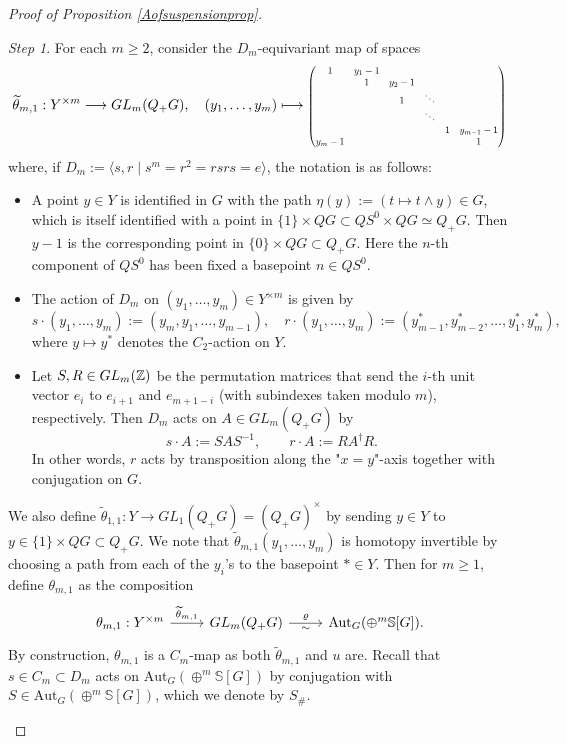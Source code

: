 \documentclass[a4paper, oneside]{amsart}
\newcommand{\1}{\mathds{1}}
\theoremstyle{remark}
\newtheorem{step}{Step}
\theoremstyle{definition}
\newcommand{\Z}{{\scaleobj{0.97}{\mathbb{Z}}}}
\newcommand{\s}{\mathbb{S}}
\numberwithin{equation}{section}
\begin{document}
\begin{proof}[Proof of Proposition \ref{Aofsuspensionprop}]
\begin{step}
For each $m\geq 2$, consider the $D_m$-equivariant map of spaces
    $$
\widetilde{\theta}_{m,1}: Y^{\times m}\longrightarrow GL_m(Q_+G), \quad (y_1,\dots, y_m)\longmapsto \resizebox{5cm}{!}{$\begin{pmatrix}
    1 & y_1-1 & &&&\\
    &1& y_2-1 &&&\\
    &&1&\ddots&&\\
    &&&\ddots&&\\
    &&&&1&y_{m-1}-1\\
    y_m-1 &&&&&1
\end{pmatrix}$}
    $$
    where, if $D_m:=\langle s,r\mid s^m=r^2=rsrs=e\rangle$, the notation is as follows:
\begin{itemize}\setlength\itemsep{3pt}
    \item A point $y\in Y$ is identified in $G$ with the path $\eta(y):=(t\mapsto t\wedge y)\in G$, which is itself identified with a point in $\{1\}\times QG\subset QS^0\times QG\simeq Q_+G$. Then $y-1$ is the corresponding point in $\{0\}\times QG\subset Q_+G$. Here the $n$-th component of $QS^0$ has been fixed a basepoint $n\in QS^0$.


    \item The action of $D_m$ on $(y_1,\dots, y_m)\in Y^{\times m}$ is given by
    $$
s\cdot (y_1,\dots, y_m):=(y_m, y_1,\dots, y_{m-1}), \quad r\cdot(y_1,\dots, y_m):=(y^*_{m-1}, y^*_{m-2},\dots,  y_1^*, y_m^*),
    $$
    where $y\mapsto  y^*$ denotes the $C_2$-action on $Y$.

    \item Let $S, R\in GL_m(\Z)$ be the permutation matrices that send the $i$-th unit vector $e_i$ to $e_{i+1}$ and $e_{m+1-i}$ (with subindexes taken modulo $m$), respectively. Then $D_m$ acts on $A\in GL_m(Q_+ G)$ by
    $$
s\cdot A:=SAS^{-1}, \qquad r\cdot A:= RA^{\dagger}R.
    $$
    In other words, $r$ acts by transposition along the "$x=y$"-axis together with conjugation on $G$. 
\end{itemize}
    We also define $\widetilde{\theta}_{1,1}: Y\to GL_1(Q_+G)=(Q_+G)^\times$ by sending $y\in Y$ to $y\in \{1\}\times QG\subset Q_+G$. We note that $\widetilde{\theta}_{m,1}(y_1,\dots, y_m)$ is homotopy invertible by choosing a path from each of the $y_i$'s to the basepoint $*\in Y$. Then for $m\geq 1$, define $\theta_{m,1}$ as the composition
    $$
\begin{tikzcd}
    \theta_{m,1}: Y^{\times m}\rar["\widetilde{\theta}_{m,1}"]&GL_m(Q_+G)\rar["\varrho", "\sim"'] & \mathrm{Aut}_G(\oplus^m\s[G]).
\end{tikzcd}
    $$
    By construction, $\theta_{m,1}$ is a $C_m$-map as both $\widetilde{\theta}_{m,1}$ and $u$ are. Recall that $s\in C_m\subset D_m$ acts on $\mathrm{Aut}_G(\oplus^m\s[G])$ by conjugation with $S\in \mathrm{Aut}_G(\oplus^m\s[G])$, which we denote by $S_{\#}$.
    \end{step}
    



\end{proof}
\end{document}
